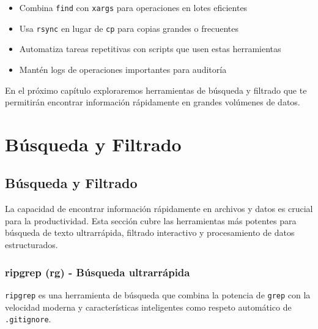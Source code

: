 \documentclass[
  11pt,
  letterpaper,
  oneside,
  openany]{scrbook}
\providecommand{\tightlist}{%
  \setlength{\itemsep}{0pt}\setlength{\parskip}{0pt}}
\begin{document}
\begin{tcolorbox}[enhanced jigsaw, coltitle=black, breakable, arc=.35mm, toprule=.15mm, colbacktitle=quarto-callout-tip-color!10!white, colframe=quarto-callout-tip-color-frame, opacityback=0, colback=white, bottomtitle=1mm, bottomrule=.15mm, rightrule=.15mm, left=2mm, toptitle=1mm, leftrule=.75mm, title=\textcolor{quarto-callout-tip-color}{\faLightbulb}\hspace{0.5em}{Tips para gestión de archivos}, titlerule=0mm, opacitybacktitle=0.6]

\begin{itemize}
\tightlist
\item
  Combina \texttt{find} con \texttt{xargs} para operaciones en lotes
  eficientes
\item
  Usa \texttt{rsync} en lugar de \texttt{cp} para copias grandes o
  frecuentes
\item
  Automatiza tareas repetitivas con scripts que usen estas herramientas
\item
  Mantén logs de operaciones importantes para auditoría
\end{itemize}

\end{tcolorbox}

En el próximo capítulo exploraremos herramientas de búsqueda y filtrado
que te permitirán encontrar información rápidamente en grandes volúmenes
de datos.

\part{Búsqueda y Filtrado}

\chapter{Búsqueda y Filtrado}\label{buxfasqueda-y-filtrado-2}

La capacidad de encontrar información rápidamente en archivos y datos es
crucial para la productividad. Esta sección cubre las herramientas más
potentes para búsqueda de texto ultrarrápida, filtrado interactivo y
procesamiento de datos estructurados.

\section{ripgrep (rg) - Búsqueda ultrarrápida}\label{sec-ripgrep}

\texttt{ripgrep} es una herramienta de búsqueda que combina la potencia
de \texttt{grep} con la velocidad moderna y características inteligentes
como respeto automático de \texttt{.gitignore}.
\end{document}
